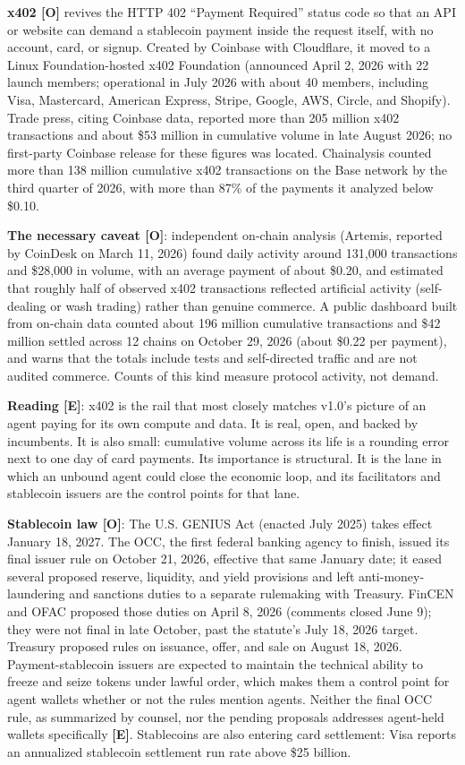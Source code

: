 \documentclass[11pt,letterpaper]{article}
\begin{document}
\textbf{x402 [O]} revives the HTTP 402 ``Payment Required'' status code so that an API or website can demand a stablecoin payment inside the request itself, with no account, card, or signup. Created by Coinbase with Cloudflare, it moved to a Linux Foundation-hosted x402 Foundation (announced April 2, 2026 with 22 launch members; operational in July 2026 with about 40 members, including Visa, Mastercard, American Express, Stripe, Google, AWS, Circle, and Shopify). Trade press, citing Coinbase data, reported more than 205 million x402 transactions and about \$53 million in cumulative volume in late August 2026; no first-party Coinbase release for these figures was located. Chainalysis counted more than 138 million cumulative x402 transactions on the Base network by the third quarter of 2026, with more than 87\% of the payments it analyzed below \$0.10.

\textbf{The necessary caveat [O]}: independent on-chain analysis (Artemis, reported by CoinDesk on March 11, 2026) found daily activity around 131,000 transactions and \$28,000 in volume, with an average payment of about \$0.20, and estimated that roughly half of observed x402 transactions reflected artificial activity (self-dealing or wash trading) rather than genuine commerce. A public dashboard built from on-chain data counted about 196 million cumulative transactions and \$42 million settled across 12 chains on October 29, 2026 (about \$0.22 per payment), and warns that the totals include tests and self-directed traffic and are not audited commerce. Counts of this kind measure protocol activity, not demand.

\textbf{Reading [E]}: x402 is the rail that most closely matches v1.0's picture of an agent paying for its own compute and data. It is real, open, and backed by incumbents. It is also small: cumulative volume across its life is a rounding error next to one day of card payments. Its importance is structural. It is the lane in which an unbound agent could close the economic loop, and its facilitators and stablecoin issuers are the control points for that lane.

\textbf{Stablecoin law [O]}: The U.S. GENIUS Act (enacted July 2025) takes effect January 18, 2027. The OCC, the first federal banking agency to finish, issued its final issuer rule on October 21, 2026, effective that same January date; it eased several proposed reserve, liquidity, and yield provisions and left anti-money-laundering and sanctions duties to a separate rulemaking with Treasury. FinCEN and OFAC proposed those duties on April 8, 2026 (comments closed June 9); they were not final in late October, past the statute's July 18, 2026 target. Treasury proposed rules on issuance, offer, and sale on August 18, 2026. Payment-stablecoin issuers are expected to maintain the technical ability to freeze and seize tokens under lawful order, which makes them a control point for agent wallets whether or not the rules mention agents. Neither the final OCC rule, as summarized by counsel, nor the pending proposals addresses agent-held wallets specifically \textbf{[E]}. Stablecoins are also entering card settlement: Visa reports an annualized stablecoin settlement run rate above \$25 billion.
\end{document}
